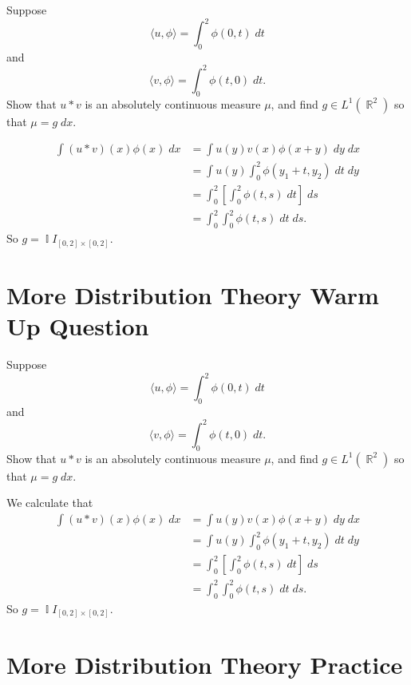 \documentclass[answers]{exam}
\DeclareMathOperator{\RR}{\mathbb{R}}
\DeclareMathOperator{\II}{\mathbb{I}}
\begin{document}
\begin{questions}
\question Suppose
%
\[ \langle u, \phi \rangle = \int_0^2 \phi(0,t)\; dt \]
%
and
%
\[ \langle v, \phi \rangle = \int_0^2 \phi(t,0)\; dt. \]
%
Show that $u * v$ is an absolutely continuous measure $\mu$, and find $g \in L^1(\RR^2)$ so that $\mu = g\; dx$.
\begin{solution}
\begin{align*}
		\int (u * v)(x) \phi(x)\; dx &= \int u(y) v(x) \phi(x + y)\; dy\; dx\\
		&= \int u(y) \int_0^2 \phi(y_1 + t,y_2)\; dt\; dy\\
		&= \int_0^2 \left[ \int_0^2 \phi(t,s)\; dt \right]\; ds\\
		&= \int_0^2 \int_0^2 \phi(t,s)\; dt\; ds.
	\end{align*}
	So $g = \II{I}_{[0,2] \times [0,2]}$.
\end{solution}

\newpage
\section{More Distribution Theory Warm Up Question}

\question Suppose
%
\[ \langle u, \phi \rangle = \int_0^2 \phi(0,t)\; dt \]
%
and
%
\[ \langle v, \phi \rangle = \int_0^2 \phi(t,0)\; dt. \]
%
Show that $u * v$ is an absolutely continuous measure $\mu$, and find $g \in L^1(\RR^2)$ so that $\mu = g\; dx$.
\begin{solution}
		We calculate that
\begin{align*}
		\int (u * v)(x) \phi(x)\; dx &= \int u(y) v(x) \phi(x + y)\; dy\; dx\\
		&= \int u(y) \int_0^2 \phi(y_1 + t,y_2)\; dt\; dy\\
		&= \int_0^2 \left[ \int_0^2 \phi(t,s)\; dt \right]\; ds\\
		&= \int_0^2 \int_0^2 \phi(t,s)\; dt\; ds.
	\end{align*}
	So $g = \II{I}_{[0,2] \times [0,2]}$.
\end{solution}

\newpage
\section{More Distribution Theory Practice}


\end{questions}
\end{document}

